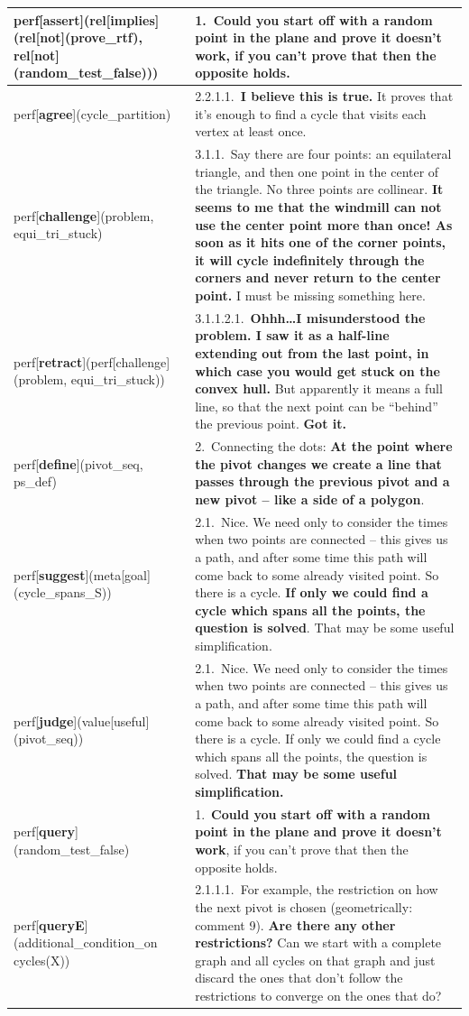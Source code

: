 \documentclass[smallextended,oneside]{svjour3}       %
\newcounter{turn}
\begin{document}
\noindent\begin{tabular}{|p{}|p{}|}
\hline
perf[\textbf{assert}](rel[implies](rel[not](prove_rtf), rel[not](random_test_false))) & 1.~Could you start off with a random point in the plane and prove it doesn't work, \textbf{if you can't prove that then the opposite holds.}\\ \hline
perf[\textbf{agree}](cycle_partition) & 2.2.1.1.~\textbf{I believe this is true.} It proves that it's enough to find a cycle that visits each vertex at least once.\\ \hline
perf[\textbf{challenge}](problem, equi_tri_stuck) & 3.1.1.~Say there are four points: an equilateral triangle, and then one point in the center of the triangle. No three points are collinear. \textbf{It seems to me that the windmill can not use the center point more than once! As soon as it hits one of the corner points, it will cycle indefinitely through the corners and never return to the center point.} I must be missing something here.\\ \hline
perf[\textbf{retract}](perf[challenge](problem, equi_tri_stuck)) & 3.1.1.2.1.~\textbf{Ohhh\ldots I misunderstood the problem. I saw it as a half-line extending out from the last point, in which case you would get stuck on the convex hull.} But apparently it means a full line, so that the next point can be ``behind'' the previous point. \textbf{Got it.} \\ \hline
perf[\textbf{define}](pivot_seq, ps_def) & 2.~Connecting the dots: \textbf{At the point where the pivot changes we create a line that passes through the previous pivot and a new pivot -- like a side of a polygon}.\\ \hline
perf[\textbf{suggest}](meta[goal](cycle_spans_S)) & 2.1.~Nice. We need only to consider the times when two points are connected -- this gives us a path, and after some time this path will come back to some already visited point. So there is a cycle. \textbf{If only we could find a cycle which spans all the points, the question is solved}. That may be some useful simplification.\\ \hline
perf[\textbf{judge}](value[useful](pivot_seq)) & 2.1.~Nice. We need only to consider the times when two points are connected -- this gives us a path, and after some time this path will come back to some already visited point. So there is a cycle. If only we could find a cycle which spans all the points, the question is solved. \textbf{That may be some useful simplification.} \\ \hline
perf[\textbf{query}](random_test_false) & 1.~\textbf{Could you start off with a random point in the plane and prove it doesn't work}, if you can't prove that then the opposite holds. \\ \hline
perf[\textbf{queryE}](additional_condition_on cycles(X)) & 2.1.1.1.~For example, the restriction on how the next pivot is chosen (geometrically: comment 9). \textbf{Are there any other restrictions?} Can we start with a complete graph and all cycles on that graph and just discard the ones that don't follow the restrictions to converge on the ones that do?\\ \hline
\end{tabular}
\end{document}
